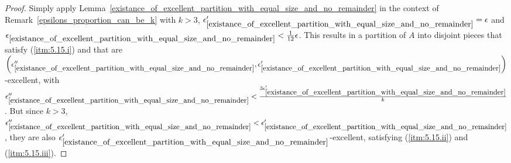         \begin{proof}
            Simply apply Lemma~\ref{existance_of_excellent_partition_with_equal_size_and_no_remainder} in the context of
            Remark~\ref{epsilons_proportion_can_be_k} with $k > 3$, ${\epsilon'_{\ref{existance_of_excellent_partition_with_equal_size_and_no_remainder}}} = \epsilon$
            and ${\epsilon_{\ref{existance_of_excellent_partition_with_equal_size_and_no_remainder}}} < \frac{1}{12} \epsilon$.
            This results in a partition of $A$ into disjoint pieces that satisfy (\ref{itm:5.15.i}) and that are
            $\left( {\epsilon''_{\ref{existance_of_excellent_partition_with_equal_size_and_no_remainder}}},
                \epsilon'_{\ref{existance_of_excellent_partition_with_equal_size_and_no_remainder}} \right)$-excellent,
            with ${\epsilon''_{\ref{existance_of_excellent_partition_with_equal_size_and_no_remainder}}} <
                \frac{3 \epsilon'_{\ref{existance_of_excellent_partition_with_equal_size_and_no_remainder}}}{k}$.
            But since $k > 3$, ${\epsilon''_{\ref{existance_of_excellent_partition_with_equal_size_and_no_remainder}}} <
                \epsilon'_{\ref{existance_of_excellent_partition_with_equal_size_and_no_remainder}}$, they are also
            $\epsilon'_{\ref{existance_of_excellent_partition_with_equal_size_and_no_remainder}}$-excellent, satisfying
            (\ref{itm:5.15.ii}) and (\ref{itm:5.15.iii}).
        \end{proof}

